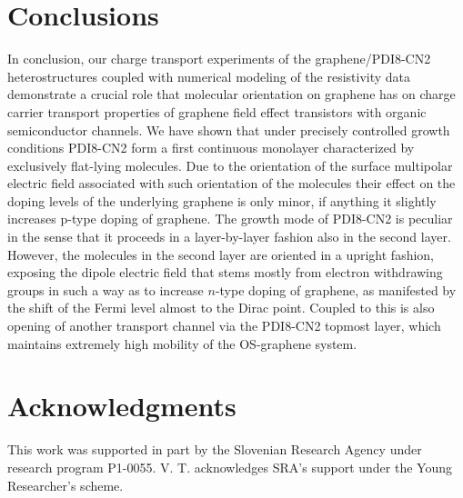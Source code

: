 \documentclass[review]{elsarticle}
\begin{document}
\section{Conclusions}
\label{sec:conc}

In conclusion, our charge transport experiments of the graphene/PDI8-CN2 heterostructures coupled with numerical modeling of the resistivity data demonstrate a crucial role that molecular orientation on graphene has on charge carrier transport properties of graphene field effect transistors with organic semiconductor channels.
  We have shown that under precisely controlled growth conditions PDI8-CN2 form a first continuous monolayer characterized by exclusively flat-lying molecules.
  Due to the orientation of the surface multipolar electric field associated with such orientation of the molecules their effect on the doping levels  of  the underlying graphene is only minor, if anything it slightly increases p-type doping of graphene.
 The growth mode of PDI8-CN2 is peculiar in the sense that it proceeds in a layer-by-layer fashion also in the second layer.
 However, the molecules in the second layer are oriented in a upright fashion, exposing the dipole electric field that stems mostly from electron withdrawing groups in such a way as to increase $n$-type doping of graphene, as manifested by the shift of the Fermi  level almost to the Dirac point.
  Coupled to this is also opening of another transport channel via the PDI8-CN2 topmost layer, which maintains extremely high mobility of the OS-graphene system.


\section*{Acknowledgments}


This work was supported in part by the Slovenian Research Agency under research program P1-0055.
  V. T.  acknowledges SRA's support under the Young Researcher's scheme.
   



\end{document}
